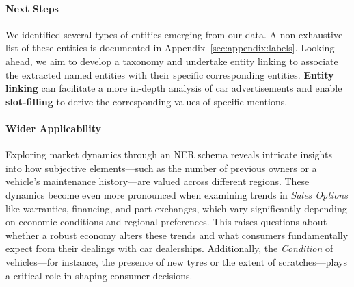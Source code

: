 \documentclass[11pt]{article}
\begin{document}




\paragraph{Next Steps}
We identified several types of entities emerging from our data. A non-exhaustive list of these entities is documented in Appendix~\ref{sec:appendix:labels}. Looking ahead, we aim to develop a taxonomy and undertake entity linking to associate the extracted named entities with their specific corresponding entities. \textbf{Entity linking} can facilitate a more in-depth analysis of car advertisements and enable \textbf{slot-filling} to derive the corresponding values of specific mentions.


\paragraph{Wider Applicability}
Exploring market dynamics through an NER schema reveals intricate insights into how subjective elements—such as the number of previous owners or a vehicle's maintenance history—are valued across different regions. These dynamics become even more pronounced when examining trends in \textit{Sales Options} like warranties, financing, and part-exchanges, which vary significantly depending on economic conditions and regional preferences. This raises questions about whether a robust economy alters these trends and what consumers fundamentally expect from their dealings with car dealerships. Additionally, the \textit{Condition} of vehicles—for instance, the presence of new tyres or the extent of scratches—plays a critical role in shaping consumer decisions.
\end{document}
